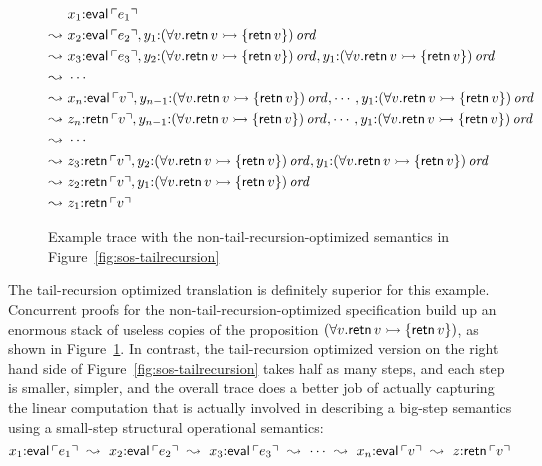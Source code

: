 \begin{figure}
\begin{align*}
& x_1{:}{\sf eval}\,{\ulcorner{e_1}\urcorner} \\
\leadsto ~ & x_2{:}{\sf eval}\,{\ulcorner{e_2}\urcorner}, 
  y_1{:}{(\forall v. {\sf retn}\,v \rightarrowtail \{ {\sf retn}\,v \})}\,{{\it ord}} \\
\leadsto ~ & x_3{:}{\sf eval}\,{\ulcorner{e_3}\urcorner}, 
  y_2{:}{(\forall v. {\sf retn}\,v \rightarrowtail \{ {\sf retn}\,v \})}\,{{\it ord}}, 
  y_1{:}{(\forall v. {\sf retn}\,v \rightarrowtail \{ {\sf retn}\,v \})}\,{{\it ord}} \\
\leadsto ~ & \cdots\\
\leadsto ~ & x_n{:}{\sf eval}\,{\ulcorner{v}\urcorner}, 
  y_{n-1}{:}{(\forall v. {\sf retn}\,v \rightarrowtail \{ {\sf retn}\,v \})}\,{{\it ord}}, 
  \cdots,
  y_1{:}{(\forall v. {\sf retn}\,v \rightarrowtail \{ {\sf retn}\,v \})}\,{{\it ord}} \\
\leadsto ~ & z_n{:}{\sf retn}\,{\ulcorner{v}\urcorner}, 
  y_{n-1}{:}{(\forall v. {\sf retn}\,v \rightarrowtail \{ {\sf retn}\,v \})}\,{{\it ord}}, 
  \cdots,
  y_1{:}{(\forall v. {\sf retn}\,v \rightarrowtail \{ {\sf retn}\,v \})}\,{{\it ord}} \\
\leadsto ~ & \cdots \\
\leadsto ~ & z_3{:}{\sf retn}\,{\ulcorner{v}\urcorner}, 
  y_2{:}{(\forall v. {\sf retn}\,v \rightarrowtail \{ {\sf retn}\,v \})}\,{{\it ord}}, 
  y_1{:}{(\forall v. {\sf retn}\,v \rightarrowtail \{ {\sf retn}\,v \})}\,{{\it ord}} \\
\leadsto ~ & z_2{:}{\sf retn}\,{\ulcorner{v}\urcorner}, 
  y_1{:}{(\forall v. {\sf retn}\,v \rightarrowtail \{ {\sf retn}\,v \})}\,{{\it ord}} \\
\leadsto ~ & z_1{:}{\sf retn}\,{\ulcorner{v}\urcorner}
\end{align*}
\caption{Example trace with the non-tail-recursion-optimized
  semantics in Figure~\ref{fig:sos-tailrecursion}}
\label{fig:example-proc-non-tail-recursive-trace}
\end{figure}

The tail-recursion optimized translation is definitely superior for
this example. Concurrent proofs for the non-tail-recursion-optimized
specification build up an enormous stack of useless copies of the
proposition $(\forall v. {\sf retn}\,v \rightarrowtail \{ {\sf retn}\,v \})$,
as shown in Figure~\ref{fig:example-proc-non-tail-recursive-trace}.
In contrast, the tail-recursion optimized version on the right hand
side of Figure~\ref{fig:sos-tailrecursion} takes half as many steps,
and each step is smaller, simpler, and the overall trace does a better
job of actually capturing the linear computation that is actually
involved in describing a big-step semantics using a small-step
structural operational semantics:
\[
x_1{:}{\sf eval}\,{\ulcorner{e_1}\urcorner} 
 ~\leadsto~
x_2{:}{\sf eval}\,{\ulcorner{e_2}\urcorner}
 ~\leadsto~
x_3{:}{\sf eval}\,{\ulcorner{e_3}\urcorner}
 ~\leadsto~ \cdots ~\leadsto~
x_n{:}{\sf eval}\,{\ulcorner{v}\urcorner}
 ~\leadsto~ 
z{:}{\sf retn}\,{\ulcorner{v}\urcorner}
\]

